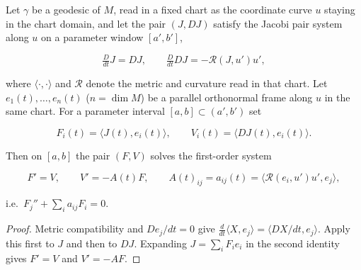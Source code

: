 \begin{lemma}
  \label{lem:dc-ch8-2-1-frame-coeff-bridge}


  Let $\gamma$ be a geodesic of $M$, read in a fixed chart as the coordinate curve $u$
  staying in the chart domain, and let the pair $(J,DJ)$ satisfy the Jacobi pair system
  along $u$ on a parameter window $[a',b']$,

  $$
  \tfrac{D}{dt}J=DJ,\qquad \tfrac{D}{dt}DJ=-\mathcal R(J,u')u' ,
  $$

  where $\langle\cdot,\cdot\rangle$ and $\mathcal R$ denote the metric and curvature read in
  that chart. Let $e_1(t),\dots,e_n(t)$ ($n=\dim M$) be a parallel orthonormal frame along
  $u$ in the same chart. For a parameter interval $[a,b]\subset(a',b')$ set

  $$
  F_i(t)=\langle J(t),e_i(t)\rangle,\qquad V_i(t)=\langle DJ(t),e_i(t)\rangle .
  $$

  Then on $[a,b]$ the pair $(F,V)$ solves the first-order system

  $$
  F'=V,\qquad V'=-A(t)F,\qquad A(t)_{ij}=a_{ij}(t)=\langle\mathcal R(e_i,u')u',e_j\rangle ,
  $$

  i.e.\ $F_j''+\sum_i a_{ij}F_i=0$.
\end{lemma}
\begin{proof}

\sketch
  Metric compatibility and $De_j/dt=0$ give
  $\frac d{dt}\langle X,e_j\rangle=\langle DX/dt,e_j\rangle$.
  Apply this first to $J$ and then to $DJ$. Expanding $J=\sum_iF_ie_i$ in the
  second identity gives $F'=V$ and $V'=-AF$.
\end{proof}

